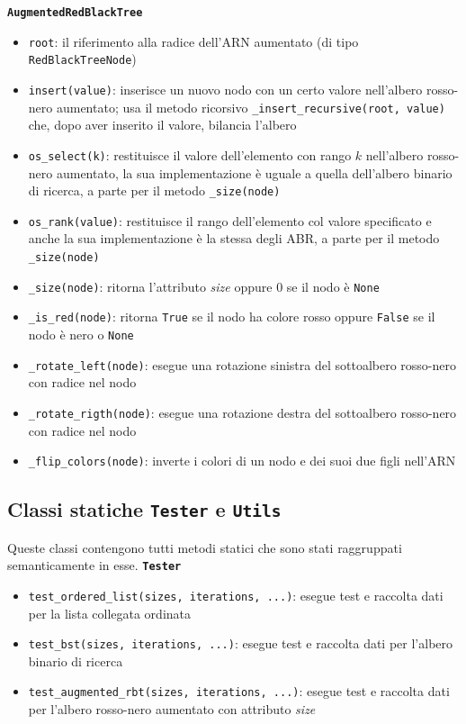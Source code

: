 \documentclass[onecolumn]{article}
\begin{document}
\newpage
{\setlength{\parindent}{0em} \texttt{\textbf{AugmentedRedBlackTree}}}
\begin{itemize}
	\setlength\itemsep{0em}
	\item \verb|root|: il riferimento alla radice dell'ARN aumentato (di tipo \texttt{RedBlackTreeNode})
	\item \verb|insert(value)|: inserisce un nuovo nodo con un certo valore nell'albero rosso-nero aumentato; usa il metodo ricorsivo \texttt{\_insert\_recursive(root, value)} che, dopo aver inserito il valore, bilancia l'albero
	\item \verb|os_select(k)|: restituisce il valore dell'elemento con rango $k$ nell'albero rosso-nero aumentato, la sua implementazione è uguale a quella dell'albero binario di ricerca, a parte per il metodo \texttt{\_size(node)}
	\item \verb|os_rank(value)|: restituisce il rango dell'elemento col valore specificato e anche la sua implementazione è la stessa degli ABR, a parte per il metodo \texttt{\_size(node)}
	\item \verb|_size(node)|: ritorna l'attributo \textit{size} oppure 0 se il nodo è \texttt{None}
	\item \verb|_is_red(node)|: ritorna \texttt{True} se il nodo ha colore rosso oppure \texttt{False} se il nodo è nero o \texttt{None}
	\item \verb|_rotate_left(node)|: esegue una rotazione sinistra del sottoalbero rosso-nero con radice nel nodo
	\item \verb|_rotate_rigth(node)|: esegue una rotazione destra del sottoalbero rosso-nero con radice nel nodo
	\item \verb|_flip_colors(node)|: inverte i colori di un nodo e dei suoi due figli nell'ARN
\end{itemize}

\subsection{Classi statiche \texttt{Tester} e \texttt{Utils}}

Queste classi contengono tutti metodi statici che sono stati raggruppati semanticamente in esse.
\vspace{0.75em}
\newline
\texttt{\textbf{Tester}}
\begin{itemize}
	\setlength\itemsep{0em}
	\item \verb|test_ordered_list(sizes, iterations, ...)|: esegue test e raccolta dati per la lista collegata ordinata
	\item \verb|test_bst(sizes, iterations, ...)|: esegue test e raccolta dati per l'albero binario di ricerca
	\item \verb|test_augmented_rbt(sizes, iterations, ...)|: esegue test e raccolta dati per l'albero rosso-nero aumentato con attributo \textit{size}
\end{itemize}
\end{document}
